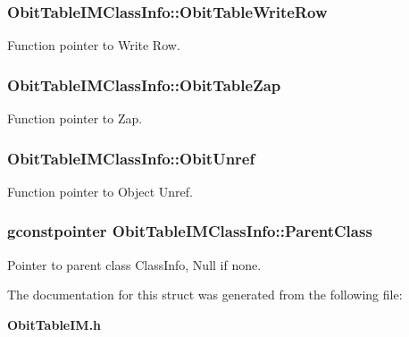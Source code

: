 \subsubsection{ {\bf Obit\-Table\-IMClass\-Info::Obit\-Table\-Write\-Row}}\label{structObitTableIMClassInfo_o26}


Function pointer to Write Row. 

\subsubsection{ {\bf Obit\-Table\-IMClass\-Info::Obit\-Table\-Zap}}\label{structObitTableIMClassInfo_o19}


Function pointer to Zap. 

\subsubsection{ {\bf Obit\-Table\-IMClass\-Info::Obit\-Unref}}\label{structObitTableIMClassInfo_o11}


Function pointer to Object Unref. 

\subsubsection{\setlength{\rightskip}{0pt plus 5cm}gconstpointer {\bf Obit\-Table\-IMClass\-Info::Parent\-Class}}\label{structObitTableIMClassInfo_o3}


Pointer to parent class Class\-Info, Null if none. 



The documentation for this struct was generated from the following file:\begin{CompactItemize}
\item 
{\bf Obit\-Table\-IM.h}\end{CompactItemize}
